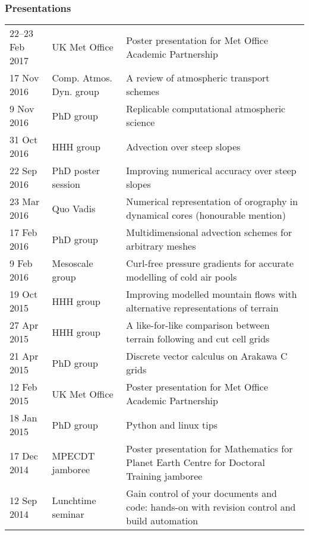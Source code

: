 \documentclass[a4paper,11pt]{article}
\begin{document}
\subsubsection*{Presentations}
\begin{tabularx}{\linewidth}{l l X}
22--23 Feb 2017 & UK Met Office & Poster presentation for Met Office Academic Partnership \\
17 Nov 2016 & Comp. Atmos. Dyn. group & A review of atmospheric transport schemes \\
9 Nov 2016 & PhD group & Replicable computational atmospheric science \\
31 Oct 2016 & HHH group & Advection over steep slopes \\
22 Sep 2016 & PhD poster session & Improving numerical accuracy over steep slopes \\
23 Mar 2016 & Quo Vadis & Numerical representation of orography in dynamical cores (honourable mention) \\
17 Feb 2016 & PhD group & Multidimensional advection schemes for arbitrary meshes \\
9 Feb 2016 & Mesoscale group & Curl-free pressure gradients for accurate modelling of cold air pools \\
19 Oct 2015 & HHH group & Improving modelled mountain flows with alternative representations of terrain \\
27 Apr 2015 & HHH group & A like-for-like comparison between terrain following and cut cell grids \\
21 Apr 2015 & PhD group & Discrete vector calculus on Arakawa C grids \\
12 Feb 2015 & UK Met Office & Poster presentation for Met Office Academic Partnership \\
18 Jan 2015 & PhD group & Python and linux tips \\
17 Dec 2014 & MPECDT jamboree & Poster presentation for Mathematics for Planet Earth Centre for Doctoral Training jamboree \\
12 Sep 2014 & Lunchtime seminar  & Gain control of your documents and code: hands-on with revision control and build automation \\
\end{tabularx}
\end{document}
